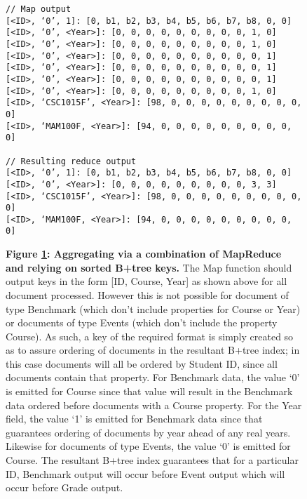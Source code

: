 \begin{figure}[H]
    \centering
    \begin{mdframed}
        \centering
        \begin{verbatim}
// Map output
[<ID>, ‘0’, 1]: [0, b1, b2, b3, b4, b5, b6, b7, b8, 0, 0]
[<ID>, ‘0’, <Year>]: [0, 0, 0, 0, 0, 0, 0, 0, 0, 1, 0]
[<ID>, ‘0’, <Year>]: [0, 0, 0, 0, 0, 0, 0, 0, 0, 1, 0]
[<ID>, ‘0’, <Year>]: [0, 0, 0, 0, 0, 0, 0, 0, 0, 0, 1]
[<ID>, ‘0’, <Year>]: [0, 0, 0, 0, 0, 0, 0, 0, 0, 0, 1]
[<ID>, ‘0’, <Year>]: [0, 0, 0, 0, 0, 0, 0, 0, 0, 0, 1]
[<ID>, ‘0’, <Year>]: [0, 0, 0, 0, 0, 0, 0, 0, 0, 1, 0]
[<ID>, ‘CSC1015F’, <Year>]: [98, 0, 0, 0, 0, 0, 0, 0, 0, 0, 0]
[<ID>, ‘MAM100F, <Year>]: [94, 0, 0, 0, 0, 0, 0, 0, 0, 0, 0]

// Resulting reduce output
[<ID>, ‘0’, 1]: [0, b1, b2, b3, b4, b5, b6, b7, b8, 0, 0]
[<ID>, ‘0’, <Year>]: [0, 0, 0, 0, 0, 0, 0, 0, 0, 3, 3]
[<ID>, ‘CSC1015F’, <Year>]: [98, 0, 0, 0, 0, 0, 0, 0, 0, 0, 0]
[<ID>, ‘MAM100F, <Year>]: [94, 0, 0, 0, 0, 0, 0, 0, 0, 0, 0]
        \end{verbatim}
    \end{mdframed}
    \caption[Aggregation By Sorted MapReduce output]{\textbf{Figure \ref{mapreduce-key-output}: Aggregating via a combination of MapReduce and relying on sorted B+tree keys.} The Map function should output keys in the form [ID, Course, Year] as shown above for all document processed. However this is not possible for document of type Benchmark (which don't include properties for Course or Year) or documents of type Events (which don't include the property Course). As such, a key of the required format is simply created so as to assure ordering of documents in the resultant B+tree index; in this case documents will all be ordered by Student ID, since all documents contain that property. For Benchmark data, the value `0' is emitted for Course since that value will result in the Benchmark data ordered before documents with a Course property. For the Year field, the value `1' is emitted for Benchmark data since that guarantees ordering of documents by year ahead of any real years. Likewise for documents of type Events, the value `0' is emitted for Course. The resultant B+tree index guarantees that for a particular ID, Benchmark output will occur before Event output which will occur before Grade output.}
    \label{mapreduce-key-output}
\end{figure}